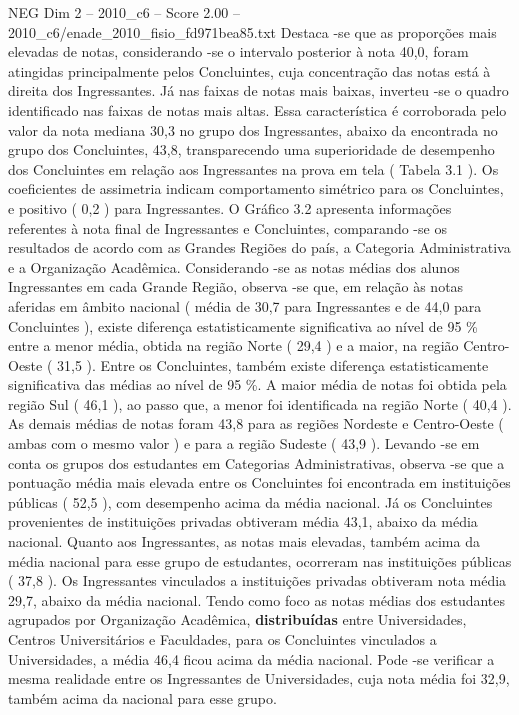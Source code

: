 \begin{textsample}{NEG Dim 2 – 2010\_c6 – Score 2.00 – 2010\_c6/enade\_2010\_fisio\_fd971bea85.txt}
Destaca -se que as proporções mais elevadas de notas, considerando -se o intervalo posterior à nota 40,0, foram atingidas principalmente pelos Concluintes, cuja concentração das notas está à direita dos Ingressantes.
Já nas faixas de notas mais baixas, inverteu -se o quadro identificado nas faixas de notas mais altas.
Essa característica é corroborada pelo valor da nota mediana 30,3 no grupo dos Ingressantes, abaixo da encontrada no grupo dos Concluintes, 43,8, transparecendo uma superioridade de desempenho dos Concluintes em relação aos Ingressantes na prova em tela ( Tabela 3.1 ).
Os coeficientes de assimetria indicam comportamento simétrico para os Concluintes, e positivo ( 0,2 ) para Ingressantes.
O Gráfico 3.2 apresenta informações referentes à nota final de Ingressantes e Concluintes, comparando -se os resultados de acordo com as Grandes Regiões do país, a Categoria Administrativa e a Organização Acadêmica.
Considerando -se as notas médias dos alunos Ingressantes em cada Grande Região, observa -se que, em relação às notas aferidas em âmbito nacional ( média de 30,7 para Ingressantes e de 44,0 para Concluintes ), existe diferença estatisticamente significativa ao nível de 95 \% entre a menor média, obtida na região Norte ( 29,4 ) e a maior, na região Centro-Oeste ( 31,5 ).
Entre os Concluintes, também existe diferença estatisticamente significativa das médias ao nível de 95 \%.
A maior média de notas foi obtida pela região Sul ( 46,1 ), ao passo que, a menor foi identificada na região Norte ( 40,4 ).
As demais médias de notas foram 43,8 para as regiões Nordeste e Centro-Oeste ( ambas com o mesmo valor ) e para a região Sudeste ( 43,9 ).
Levando -se em conta os grupos dos estudantes em Categorias Administrativas, observa -se que a pontuação média mais elevada entre os Concluintes foi encontrada em instituições públicas ( 52,5 ), com desempenho acima da média nacional.
Já os Concluintes provenientes de instituições privadas obtiveram média 43,1, abaixo da média nacional.
Quanto aos Ingressantes, as notas mais elevadas, também acima da média nacional para esse grupo de estudantes, ocorreram nas instituições públicas ( 37,8 ).
Os Ingressantes vinculados a instituições privadas obtiveram nota média 29,7, abaixo da média nacional.
Tendo como foco as notas médias dos estudantes agrupados por Organização Acadêmica, \textbf{distribuídas} entre Universidades, Centros Universitários e Faculdades, para os Concluintes vinculados a Universidades, a média 46,4 ficou acima da média nacional.
Pode -se verificar a mesma realidade entre os Ingressantes de Universidades, cuja nota média foi 32,9, também acima da nacional para esse grupo.

\end{textsample}
